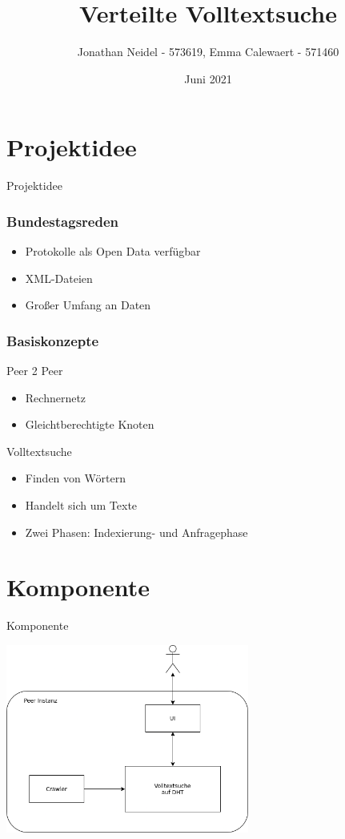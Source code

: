 \documentclass{beamer}
\title{Verteilte Volltextsuche}
\subtitle{}
\author{Jonathan Neidel - 573619, Emma Calewaert - 571460} %
\date{Juni 2021}
\institute{HTW Berlin, Angewandte Informatik, Projektstudium bei Herr Hoppe}
\begin{document}
\frame{\titlepage}

\section{Projektidee}
\begin{frame}
  \begin{center}
    {\Huge Projektidee}
  \end{center}
\end{frame}

\begin{frame}
  \frametitle{Bundestagsreden}
  \begin{itemize}
    \item Protokolle als Open Data verfügbar
    \item XML-Dateien
    \item Großer Umfang an Daten
  \end{itemize}
\end{frame}

\begin{frame}[allowframebreaks]
  \frametitle{Basiskonzepte}
  Peer 2 Peer
  \begin{itemize}
    \item Rechnernetz
    \item Gleichtberechtigte Knoten
  \end{itemize}

  \break
  Volltextsuche
    \begin{itemize}
    \item Finden von Wörtern
    \item Handelt sich um Texte
    \item Zwei Phasen: Indexierung- und Anfragephase
  \end{itemize}
\end{frame}

\section{Komponente}
\begin{frame}
  \begin{center}
    {\Huge Komponente}
  \end{center}
\end{frame}

\begin{frame}
  \begin{center}
    \includegraphics[width=8cm]{Komponente-einzeln}
  \end{center}
\end{frame}
\end{document}
